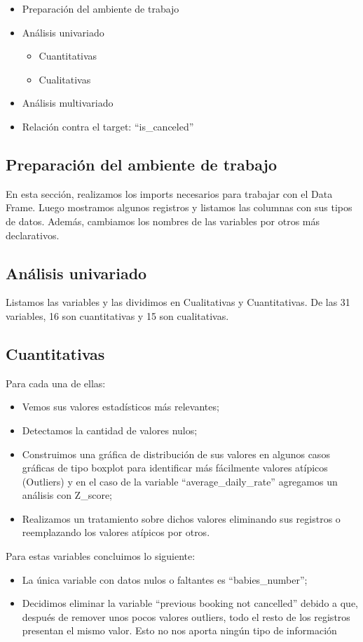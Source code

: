 \documentclass{article}
\begin{document}
\begin{itemize}
	\item Preparación del ambiente de trabajo
	\item Análisis univariado
	\begin{itemize}
		\item Cuantitativas
		\item Cualitativas
	\end{itemize}
	\item Análisis multivariado
	\item Relación contra el target: “is\_canceled”
\end{itemize}
\subsection*{Preparación del ambiente de trabajo}
En esta sección, realizamos los imports necesarios para trabajar con el Data Frame. Luego mostramos algunos registros y listamos las columnas con sus tipos de datos. Además, cambiamos los nombres de las variables por otros más declarativos.

\subsection*{Análisis univariado}
Listamos las variables y las dividimos en Cualitativas y Cuantitativas. De las 31 variables, 16 son cuantitativas y 15 son cualitativas.
\subsection*{Cuantitativas}
Para cada una de ellas:
\begin{itemize}
	\item Vemos sus valores estadísticos más relevantes;
	\item Detectamos la cantidad de valores nulos;
	\item Construimos una gráfica de distribución de sus valores en algunos casos gráficas de tipo boxplot para identificar más fácilmente valores atípicos (Outliers) y en el caso de la variable “average\_daily\_rate” agregamos un análisis con Z\_score;
	\item Realizamos un tratamiento sobre dichos valores eliminando sus registros o reemplazando los valores atípicos por otros.
\end{itemize} 
Para estas variables concluimos lo siguiente:
\begin{itemize}
	\item La única variable con datos nulos o faltantes es “babies\_number”;
	\item  Decidimos eliminar la variable “previous booking not cancelled” debido a que, después de remover unos pocos valores outliers, todo el resto de los registros presentan el mismo valor. Esto no nos aporta ningún tipo de información
\end{itemize}
\end{document}
